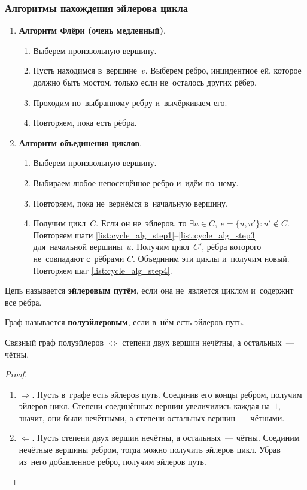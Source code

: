 \subsubsection{Алгоритмы нахождения эйлерова цикла}
\begin{enumerate}
	\item\textbf{Алгоритм Флёри (очень медленный)}.
	\begin{enumerate}
		\item Выберем произвольную вершину.
		\item Пусть находимся в~вершине~$v$.
		Выберем ребро, инцидентное ей, которое должно быть мостом, только если не~осталось других рёбер.
		\item Проходим по~выбранному ребру и~вычёркиваем его.
		\item Повторяем, пока есть рёбра.
	\end{enumerate}
	\item\textbf{Алгоритм объединения циклов}.
	\begin{enumerate}
		\item\label{list:cycle_alg_step1} Выберем произвольную вершину.
		\item Выбираем любое непосещённое ребро и~идём по~нему.
		\item\label{list:cycle_alg_step3} Повторяем, пока не~вернёмся в~начальную вершину.
		\item\label{list:cycle_alg_step4} Получим цикл~$C$.
		Если он не~эйлеров, то $\exists u \in C, \ e = \{ u, u' \} \colon u' \notin C$.
		Повторяем шаги \ref{list:cycle_alg_step1}--\ref{list:cycle_alg_step3} для~начальной вершины~$u$.
		Получим цикл~$C'$, рёбра которого не~совпадают с~рёбрами $C$.
		Объединим эти циклы и~получим новый.
		Повторяем шаг \ref{list:cycle_alg_step4}.
	\end{enumerate}
\end{enumerate}

Цепь называется \textbf{эйлеровым путём}, если она не~является циклом и~содержит все рёбра.

Граф называется \textbf{полуэйлеровым}, если в~нём есть эйлеров путь.

\begin{theorem}
Связный граф полуэйлеров $\Leftrightarrow$ степени двух вершин нечётны, а остальных~--- чётны.
\end{theorem}
\begin{proof}
\begin{enumerate}
	\item $\Rightarrow$. Пусть в~графе есть эйлеров путь.
	Соединив его концы ребром, получим эйлеров цикл.
	Степени соединённых вершин увеличились каждая на~$1$, значит, они были нечётными, а степени остальных вершин~--- чётными.
	\item $\Leftarrow$. Пусть степени двух вершин нечётны, а остальных~--- чётны.
	Соединим нечётные вершины ребром, тогда можно получить эйлеров цикл.
	Убрав из~него добавленное ребро, получим эйлеров путь.
\end{enumerate}
\end{proof}